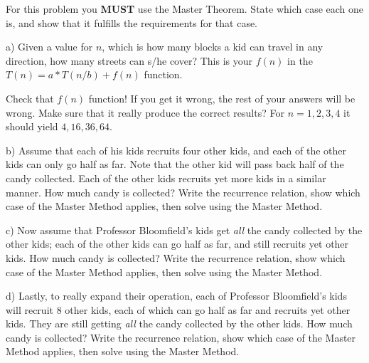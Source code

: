 \documentclass[10pt]{article}
\begin{document}
For this problem you {\bf MUST} use the Master Theorem.  State which case each one is, and show that it fulfills the requirements for that case.

\vspace{0.25in}

\noindent a) Given a value for $n$, which is how many blocks a kid can travel in any direction, how many streets can s/he cover?  This is your $f(n)$ in the $T(n)=a \ast T(n/b) + f(n)$ function.

\solution{

}


\vspace{0.25in}

\noindent Check that $f(n)$ function! If you get it wrong, the rest of your answers will be wrong. Make sure that it really produce the correct results?  For $n=1,2,3,4$ it should yield $4,16,36,64$.

\vspace{0.25in}

\noindent b) Assume that each of his kids recruits four other kids, and each of the other kids can only go half as far.  Note that the other kid will pass back half of the candy collected.  Each of the other kids recruits yet more kids in a similar manner.  How much candy is collected? Write the recurrence relation, show which case of the Master Method applies, then solve using the Master Method.

\solution{

}

\vspace{0.25in}

\noindent c) Now assume that Professor Bloomfield's kids get {\em all} the candy collected by the other kids; each of the other kids can go half as far, and still recruits yet other kids.  How much candy is collected? Write the recurrence relation, show which case of the Master Method applies, then solve using the Master Method.

\solution{

}

\vspace{0.25in}

\noindent d) Lastly, to really expand their operation, each of Professor Bloomfield's kids will recruit 8 other kids, each of which can go half as far and recruits yet other kids.  They are still getting {\em all} the candy collected by the other kids.  How much candy is collected? Write the recurrence relation, show which case of the Master Method applies, then solve using the Master Method.
\end{document}
